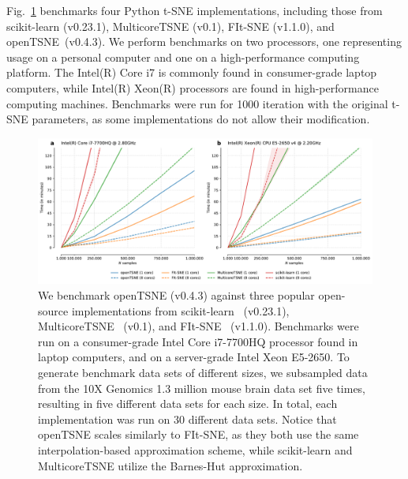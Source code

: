 \documentclass[twocolumn]{bmcart}
\newcommand{\opentsne}{\textsf{openTSNE}}
\begin{document}
Fig.~\ref{fig:benchmarks} benchmarks four Python t-SNE implementations,
including those from \textsf{scikit-learn} (v0.23.1), \textsf{MulticoreTSNE}
(v0.1), \textsf{FIt-SNE} (v1.1.0), and \opentsne\ (v0.4.3). We perform
benchmarks on two processors, one representing usage on a personal computer and
one on a high-performance computing platform. The Intel(R) Core i7 is commonly
found in consumer-grade laptop computers, while Intel(R) Xeon(R) processors are
found in high-performance computing machines. Benchmarks were run for 1000 iteration with the original t-SNE parameters, as some implementations do not
allow their modification. 

\begin{figure}[htbp]
  \includegraphics[width=\textwidth]{benchmarks}
  \caption{\label{fig:benchmarks}We benchmark openTSNE (v0.4.3) against three
	popular open-source implementations from
	scikit-learn~\cite{pedregosa2011scikit} (v0.23.1),
	MulticoreTSNE~\cite{Ulyanov2016} (v0.1), and
	FIt-SNE~\cite{linderman2019fast} (v1.1.0). Benchmarks were run on a
	consumer-grade Intel Core i7-7700HQ processor found in laptop
	computers, and on a server-grade Intel Xeon E5-2650. To generate
	benchmark data sets of different sizes, we subsampled data from the 10X
	Genomics 1.3 million mouse brain data set five times, resulting in five
	different data sets for each size. In total, each implementation was
	run on 30 different data sets. Notice that openTSNE scales similarly to
	FIt-SNE, as they both use the same interpolation-based approximation
	scheme, while scikit-learn and MulticoreTSNE utilize the Barnes-Hut
	approximation.}
\end{figure}
\end{document}
